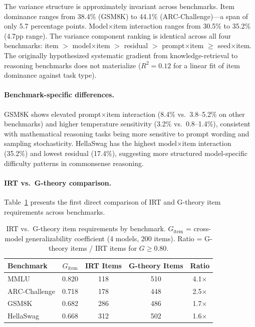 \documentclass[letterpaper]{article}
\begin{document}
The variance structure is approximately invariant across benchmarks.
Item dominance ranges from 38.4\% (GSM8K) to 44.1\% (ARC-Challenge)---a span of only 5.7 percentage points.
Model$\times$item interaction ranges from 30.5\% to 35.2\% (4.7pp range).
The variance component ranking is identical across all four benchmarks: item $>$ model$\times$item $>$ residual $>$ prompt$\times$item $\geq$ seed$\times$item.
The originally hypothesized systematic gradient from knowledge-retrieval to reasoning benchmarks does not materialize ($R^2 = 0.12$ for a linear fit of item dominance against task type).

\paragraph{Benchmark-specific differences.}
GSM8K shows elevated prompt$\times$item interaction (8.4\% vs.\ 3.8--5.2\% on other benchmarks) and higher temperature sensitivity (3.2\% vs.\ 0.8--1.4\%), consistent with mathematical reasoning tasks being more sensitive to prompt wording and sampling stochasticity.
HellaSwag has the highest model$\times$item interaction (35.2\%) and lowest residual (17.4\%), suggesting more structured model-specific difficulty patterns in commonsense reasoning.

\paragraph{IRT vs.\ G-theory comparison.}
Table~\ref{tab:irt_gtheory} presents the first direct comparison of IRT and G-theory item requirements across benchmarks.

\begin{table}[t]
\centering
\caption{IRT vs.\ G-theory item requirements by benchmark. $G_{\text{item}}$ = cross-model generalizability coefficient (4 models, 200 items). Ratio = G-theory items / IRT items for $G \geq 0.80$.}
\label{tab:irt_gtheory}
\begin{tabular}{lcccc}
\toprule
Benchmark & $G_{\text{item}}$ & IRT Items & G-theory Items & Ratio \\
\midrule
MMLU          & 0.820 & 118 & 510 & 4.1$\times$ \\
ARC-Challenge & 0.718 & 178 & 448 & 2.5$\times$ \\
GSM8K         & 0.682 & 286 & 486 & 1.7$\times$ \\
HellaSwag     & 0.668 & 312 & 502 & 1.6$\times$ \\
\bottomrule
\end{tabular}
\end{table}
\end{document}

